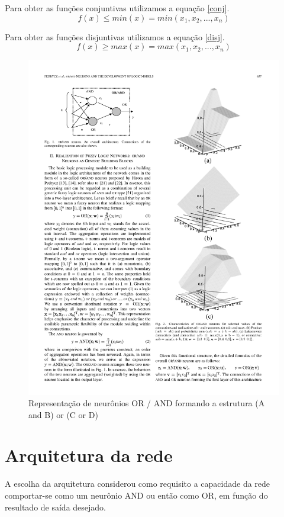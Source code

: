 \documentclass{IEEEtran}
\begin{document}
Para obter as funções conjuntivas utilizamos a equação \ref{conj}.
\begin{equation} \label{conj}
  f(x) \leq min(x) = min(x_1,x_2, ..., x_n)
\end{equation}

Para obter as funções disjuntivas utilizamos a equação \ref{disj}.
\begin{equation} \label{disj}
  f(x) \geq max(x) = max(x_1,x_2, ..., x_n)
\end{equation}

\begin{figure}
	\centering
	\includegraphics{AandBorZ.pdf}
	\caption{Representação de neurônios OR / AND formando a estrutura (A and B) or (C or D)}
	\label{neur}
\end{figure}

\section{Arquitetura da rede}
A escolha da arquitetura considerou como requisito a capacidade da rede comportar-se como um neurônio AND ou então como OR, em função do resultado de saída desejado. 
\end{document}
